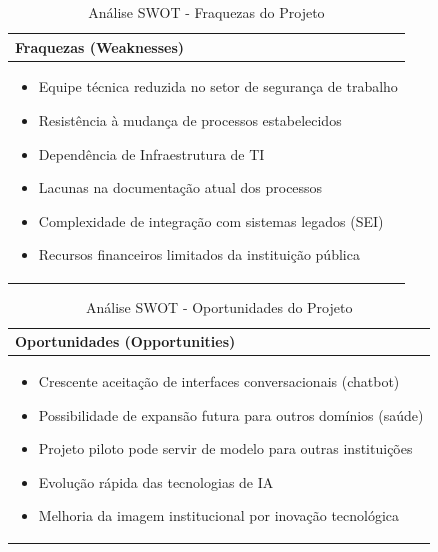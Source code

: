 \documentclass[12pt,a4paper]{article}
\begin{document}
\begin{table}[htbp]
\centering
\begin{tcolorbox}[enhanced, colback=red!5, colframe=red!40!black, arc=3mm, boxrule=0.5pt, width=0.85\textwidth]
\begin{tabular}{|p{12cm}|}
\hline
\rowcolor{red!10}\large \textbf{Fraquezas (Weaknesses)} \\
\hline
\begin{itemize}\setlength{\itemsep}{1pt}
\item Equipe técnica reduzida no setor de segurança de trabalho
\item Resistência à mudança de processos estabelecidos
\item Dependência de Infraestrutura de TI
\item Lacunas na documentação atual dos processos
\item Complexidade de integração com sistemas legados (SEI)
\item Recursos financeiros limitados da instituição pública
\end{itemize} \\
\hline
\end{tabular}
\end{tcolorbox}
\caption{Análise SWOT - Fraquezas do Projeto}
\end{table}

\begin{table}[htbp]
\centering
\begin{tcolorbox}[enhanced, colback=blue!5, colframe=blue!40!black, arc=3mm, boxrule=0.5pt, width=0.85\textwidth]
\begin{tabular}{|p{12cm}|}
\hline
\rowcolor{blue!10}\large \textbf{Oportunidades (Opportunities)} \\
\hline
\begin{itemize}\setlength{\itemsep}{1pt}
\item Crescente aceitação de interfaces conversacionais (chatbot)
\item Possibilidade de expansão futura para outros domínios (saúde)
\item Projeto piloto pode servir de modelo para outras instituições
\item Evolução rápida das tecnologias de IA
\item Melhoria da imagem institucional por inovação tecnológica
\end{itemize} \\
\hline
\end{tabular}
\end{tcolorbox}
\caption{Análise SWOT - Oportunidades do Projeto}
\end{table}
\end{document}

